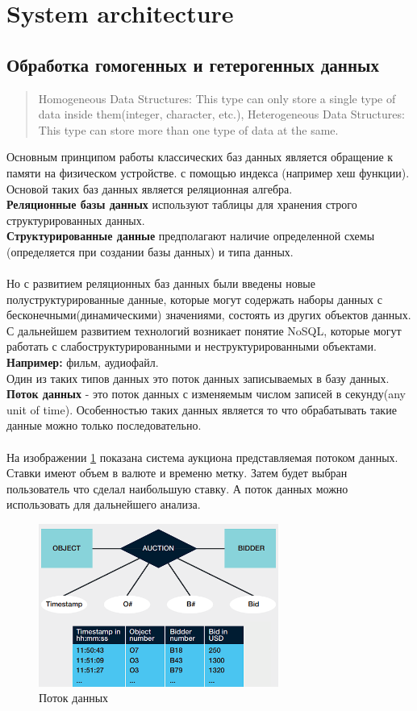 \documentclass{article}
\begin{document}
%
\tableofcontents
\newpage

\section{System architecture}


\subsection{Обработка гомогенных и гетерогенных данных}
\begin{quote}
    Homogeneous Data Structures: This type can only store a single type of data inside them(integer, character, etc.), Heterogeneous Data Structures: This type can store more than one type of data at the same.
\end{quote}
Основным принципом работы классических баз данных является обращение к памяти на физическом устройстве.
с помощью индекса (например хеш функции). Основой таких баз данных является реляционная алгебра.\\
\textbf{Реляционные базы данных} используют таблицы для хранения строго структурированных данных.\\
\textbf{Структурированные данные} предполагают наличие определенной схемы (определяется при создании базы данных) и типа данных.\\\\
Но с развитием реляционных баз данных были введены новые полуструктурированные данные, которые могут содержать наборы данных с бесконечными(динамическими) значениями, состоять из других объектов данных. С дальнейшем
развитием технологий возникает понятие NoSQL, которые могут работать с слабоструктурированными и неструктурированными объектами. \textbf{Например: } фильм, аудиофайл.\\
Один из таких типов данных это поток данных записываемых в базу данных.\\
\textbf{Поток данных} - это поток данных с изменяемым числом записей в секунду(any unit of time). Особенностью таких данных является то что обрабатывать такие данные можно только последовательно.\\\\
На изображении \ref{img1} показана система аукциона представляемая потоком данных. Ставки имеют объем в валюте и временю метку. Затем будет выбран пользователь что сделал наибольшую ставку. А поток данных можно использовать для дальнейшего анализа.
\newpage
\begin{figure}[h]
    \centering
    \includegraphics[width=0.7\textwidth]{images/datastream.png}
    \caption{Поток данных}
    \label{img1}
\end{figure}
\end{document}

